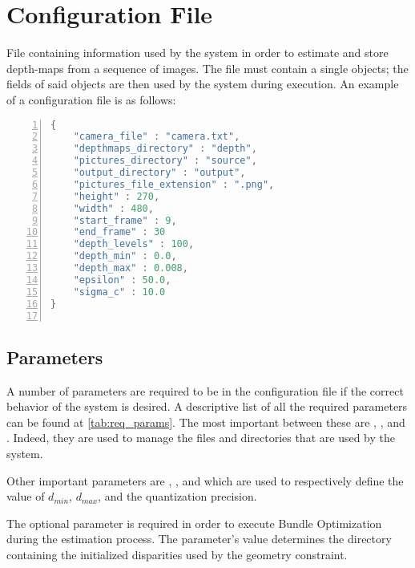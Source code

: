 \section{Configuration File}
File containing information used by the system in order to estimate and store depth-maps from a sequence of images. The file must contain a single \JSON{} objects; the fields of said objects are then used by the system during execution. An example of a configuration file is as follows:
\begin{lstlisting}[language=C,basicstyle=\ttfamily, numbers=left]
{
	"camera_file" : "camera.txt",
	"depthmaps_directory" : "depth",
	"pictures_directory" : "source",
	"output_directory" : "output",
	"pictures_file_extension" : ".png",
	"height" : 270,
	"width" : 480,
	"start_frame" : 9,
	"end_frame" : 30
	"depth_levels" : 100,
	"depth_min" : 0.0,
	"depth_max" : 0.008,
	"epsilon" : 50.0,
	"sigma_c" : 10.0
}
 
\end{lstlisting}
\dotfill

\subsection{Parameters}
A number of parameters are required to be in the configuration file if the correct behavior of the system is desired. A descriptive list of all the required parameters can be found at \cref{tab:req_params}.
The most important between these are , , and . Indeed, they are used to manage the files and directories that are used by the system.

Other important parameters are , , and  which are used to respectively define the value of $d_{min}$, $d_{max}$, and the quantization precision.\\
\begin{Important}
	The optional parameter  is required in order to execute Bundle Optimization during the estimation process. The parameter's value determines the directory containing the initialized disparities used by the geometry constraint.
\end{Important}

